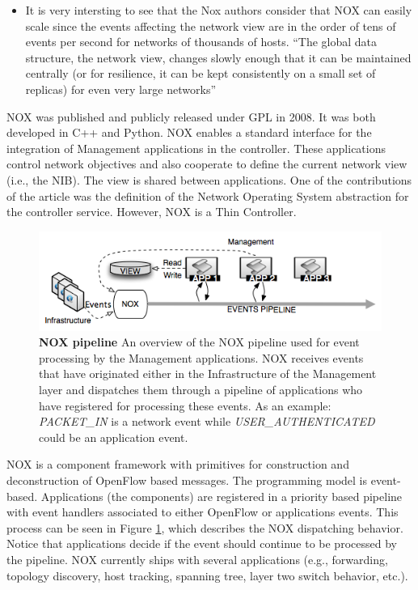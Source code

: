 \documentclass[12pt,openright,twoside]{report}
\begin{document}
\begin{itemize}
\begin{itemize}
\item It is very intersting to see that the Nox authors consider that NOX can easily scale since the events affecting the network view are in the order of tens of events per second for networks of thousands of hosts. ``The global data structure, the network view, changes slowly enough that it can be maintained centrally (or for resilience, it can be kept consistently on a small set of replicas) for even very large networks'' 
\end{itemize}


NOX \cite{Gude:2008jd}  was published and publicly released under
GPL in 2008. It was both developed in C++ and Python. NOX enables a standard interface for the integration of  Management applications 
in the controller. These applications control
network objectives and also cooperate to define the current
network view (i.e., the NIB). The view is shared between applications. One of the
contributions of the article was the definition of the Network
Operating System abstraction for the controller service. However, NOX
is a Thin Controller. 

\begin{figure}
  \centering 
  \footnotesize
  \includegraphics[scale=0.5]{pic/nox-pipeline}
  \caption[NOX pipeline] {\textbf{NOX pipeline} An overview of the NOX
    pipeline used for event processing by the Management applications. NOX
  receives events that have originated either in the Infrastructure of
the Management layer and dispatches them through a pipeline of
applications who have registered for processing these events. 
 As an example: \emph{PACKET\_IN} is a network event while
\emph{USER\_AUTHENTICATED} could be an application event.}
  \label{fig:nox-pipeline}
\end{figure}

NOX is a component framework with primitives for
construction and deconstruction of OpenFlow
based messages. The programming model is event-based. Applications (the components) are registered in a
priority based pipeline with event handlers associated to either
OpenFlow or applications events. This process can be seen in Figure
\ref{fig:nox-pipeline}, which describes the NOX dispatching behavior. Notice
that applications decide if the event should continue to be processed
by the pipeline. NOX  currently ships
with several applications (e.g., forwarding, topology discovery, host
tracking, spanning tree, layer two switch behavior, etc.).


\end{itemize}
\end{document}
